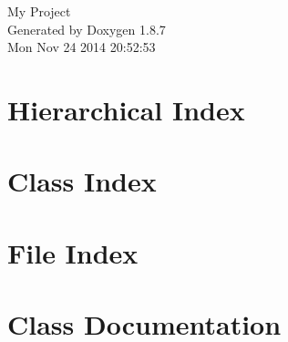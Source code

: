 \documentclass[twoside]{book}
\newcommand{\+}{\discretionary{\mbox{\scriptsize$\hookleftarrow$}}{}{}}
\newcommand{\clearemptydoublepage}{%
  \newpage{\pagestyle{empty}\cleardoublepage}%
}
\begin{document}
\hypersetup{pageanchor=false,
             bookmarks=true,
             bookmarksnumbered=true,
             pdfencoding=unicode
            }
\begin{titlepage}
\vspace*{7cm}
\begin{center}%
{\Large My Project }\\
\vspace*{1cm}
{\large Generated by Doxygen 1.8.7}\\
\vspace*{0.5cm}
{\small Mon Nov 24 2014 20:52:53}\\
\end{center}
\end{titlepage}
\clearemptydoublepage
\tableofcontents
\clearemptydoublepage
{}
\hypersetup{pageanchor=true}

\chapter{Hierarchical Index}

\chapter{Class Index}

\chapter{File Index}

\chapter{Class Documentation}








































\end{document}
